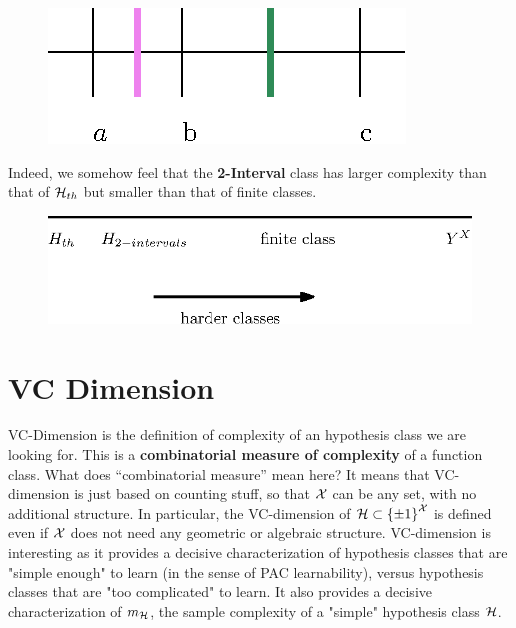{\vspace{5mm}

\begin{figure}[h!]
	\centering
	\includegraphics[scale=0.6]{chapters/pac/figures/VC_threshold_intuitive4.eps}
\end{figure}

Indeed, we somehow feel that the \textbf{2-Interval} class has larger complexity than that of $\mathcal{H}_{th}$ but smaller than that of finite classes.

\begin{figure}[h!]
	\centering
	\includegraphics[scale=0.8]{chapters/pac/figures/complexity_measure2.eps}
\end{figure}

\section{VC Dimension}

VC-Dimension is the definition of complexity of an hypothesis class we are
looking for. This is a {\bf combinatorial measure of complexity} of a function
class. What does ``combinatorial measure'' mean here? It means that VC-dimension is just based on counting stuff, so that $\mathcal{X}$ can be any
set, with no additional structure. In particular, the VC-dimension of
$\mathcal{H}\subset \left\{ \pm 1 \right\}^{\mathcal{X}}$ is defined even if $\mathcal{X}$ does not need any
geometric or algebraic structure. VC-dimension is interesting as it provides a
decisive characterization of hypothesis classes that are "simple enough" to
learn (in the sense of PAC learnability), versus hypothesis classes that are "too complicated" to learn. It also provides a decisive characterization of $m_{\mathcal{H}}$, the sample complexity of a "simple" hypothesis class $\mathcal{H}$.  

}
